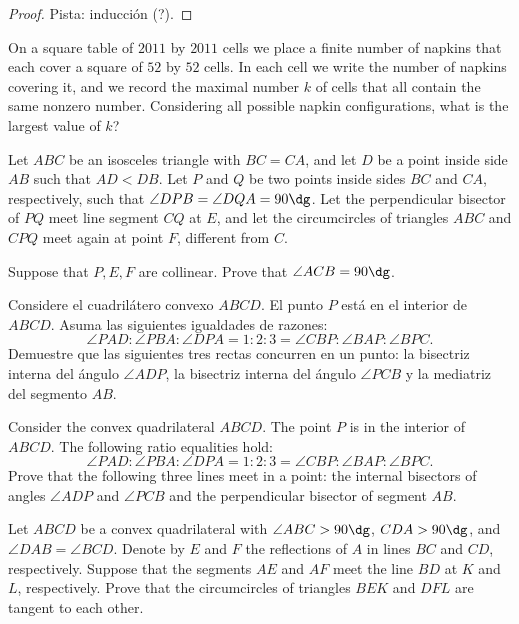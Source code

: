 \begin{proof}
	Pista: inducción (?).
\end{proof}

\begin{probH}[ISL 2011/C7]
	On a square table of $2011$ by $2011$ cells we place a finite number of napkins that each cover a square of $52$ by $52$ cells. In each cell we write the number of napkins covering it, and we record the maximal number $k$ of cells that all contain the same nonzero number. Considering all possible napkin configurations, what is the largest value of $k$?
\end{probH}


\begin{probEG}[ISL 2020/G1]
	Let $ABC$ be an isosceles triangle with $BC=CA$, and let $D$ be a point inside side $AB$ such that $AD<DB$. Let $P$ and $Q$ be two points inside sides $BC$ and $CA$, respectively, such that $\angle DPB=\angle DQA=90\dg$. Let the perpendicular bisector of $PQ$ meet line segment $CQ$ at $E$, and let the circumcircles of triangles $ABC$ and $CPQ$ meet again at point $F$, different from $C$.

	Suppose that $P,E,F$ are collinear. Prove that $\angle ACB=90\dg$.
\end{probEG}

\begin{probEG}
	Considere el cuadrilátero convexo $ABCD$. El punto $P$ está en el interior de $ABCD$. Asuma las siguientes igualdades de razones:
	\[\angle PAD:\angle PBA:\angle DPA=1:2:3=\angle CBP:\angle BAP:\angle BPC.\]
	Demuestre que las siguientes tres rectas concurren en un punto: la bisectriz interna del ángulo $\angle ADP$, la bisectriz interna del ángulo $\angle PCB$ y la mediatriz del segmento $AB$.
	\begin{hint}
		Consider the convex quadrilateral $ABCD$. The point $P$ is in the interior of $ABCD$. The following ratio equalities hold:
		\[\angle PAD:\angle PBA:\angle DPA=1:2:3=\angle CBP:\angle BAP:\angle BPC.\]
		Prove that the following three lines meet in a point: the internal bisectors of angles $\angle ADP$ and $\angle PCB$ and the perpendicular bisector of segment $AB$.
	\end{hint}
\end{probEG}

\begin{probEG}[ISL 2020/G3]
	Let $ABCD$ be a convex quadrilateral with $\angle ABC>90\dg$, $CDA>90\dg$, and $\angle DAB=\angle BCD$. Denote by $E$ and $F$ the reflections of $A$ in lines $BC$ and $CD$, respectively. Suppose that the segments $AE$ and $AF$ meet the line $BD$ at $K$ and $L$, respectively. Prove that the circumcircles of triangles $BEK$ and $DFL$ are tangent to each other.
\end{probEG}

